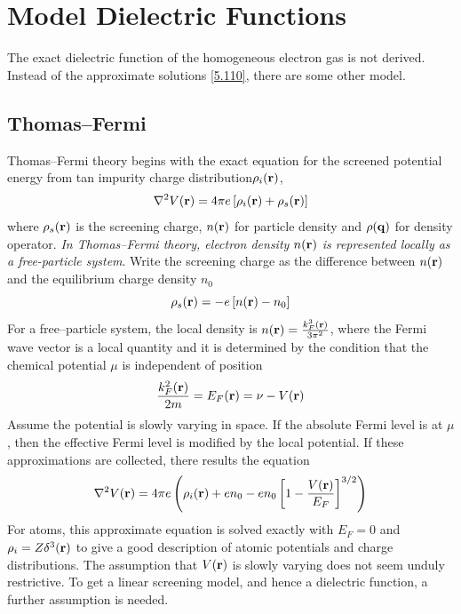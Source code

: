 \section{Model Dielectric Functions}\label{s5.5}
The exact dielectric function of the homogeneous electron gas is not derived.
Instead of the approximate solutions \eqref{5.110}, there are some other model.
\subsection{Thomas--Fermi}
Thomas--Fermi theory begins with the exact equation for the screened potential energy from tan impurity charge distribution$\rho_i(\mathbf{r})$,
\begin{equation}
    \nabla^2 V(\mathbf{r}) = 4\pi e \left[ \rho_i(\mathbf{r}) + \rho_s(\mathbf{r}) \right]   \label{5.121}
\end{equation}
where $\rho_s(\mathbf{r})$ is the screening charge, $n(\mathbf{r})$ for particle density and $\rho(\mathbf{q})$ for density operator.
\textit{In Thomas--Fermi theory, electron density $n(\mathbf{r})$ is represented locally as a free-particle system}.
Write the screening charge as the difference between $n(\mathbf{r})$ and the equilibrium charge density $n_0$
\begin{equation}
    \rho_s(\mathbf{r}) = -e \left[ n(\mathbf{r}) - n_0 \right]    \label{5.122}
\end{equation}
For a free--particle system, the local density is $n(\mathbf{r}) = \frac{k_F^3(\mathbf{r})}{3\pi^2} $, where the Fermi wave vector is a local quantity and it is determined by the condition that the chemical potential $\mu$ is independent of position
\begin{equation}
    \frac{k_F^2(\mathbf{r})}{2m}  = E_F(\mathbf{r}) = \nu - V(\mathbf{r})    \label{5.123}
\end{equation}
Assume the potential is slowly varying in space. If the absolute Fermi level is at $\mu$, then the effective Fermi level is modified by the local potential.
If these approximations are collected, there results the equation
\begin{equation}
    \nabla^2 V(\mathbf{r}) = 4\pi e \left( \rho_i(\mathbf{r}) + en_0 - en_0 \left[ 1 - \frac{V(\mathbf{r})}{E_F} \right]^{3/2} \right) \label{5.124}
\end{equation}
For atoms, this approximate equation is solved exactly with $E_F=0$ and $\rho_i = Z \delta^3(\mathbf{r})$ to give a good description of atomic potentials and charge distributions.
The assumption that $V(\mathbf{r})$ is slowly varying does not seem unduly restrictive.
To get a linear screening model, and hence a dielectric function, a further assumption is needed.
